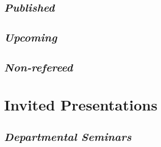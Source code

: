 \documentclass[10pt,a4paper,sans]{moderncv}        %
\begin{document}
\renewcommand*{\bibliographyhead}[1]{\subsection{Peer-reviewed}}
\subsection{\textit{Published}} %
\nocite{*}



\subsection{\textit{Upcoming}}%
\renewcommand*{\bibliographyhead}[1]{\subsection{In Preparation}}

\renewcommand*{\bibliographyhead}[1]{\subsection{Non-refereed}}
\subsection{\textit{Non-refereed}}

\section{Invited Presentations}
\renewcommand*{\bibliographyhead}[1]{}

\renewcommand*{\bibliographyhead}[1]{\subsection{Departmental Seminars}}
\subsection{\textit{Departmental Seminars}}
\end{document}
